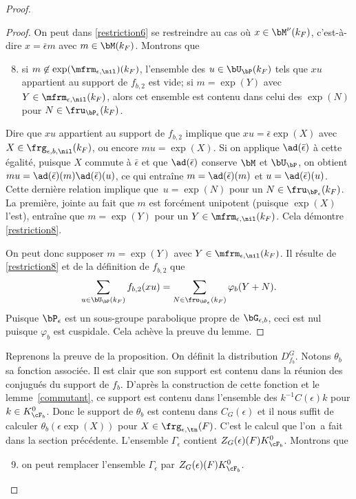 \begin{proof}
\begin{proof}
On peut dans \eqref{restriction6} se restreindre au cas où $x\in \bM^{\nu}(k_{F})$, c'est-à-dire $x=\bar{\epsilon}m$ avec $m\in \bM(k_{F})$. Montrons que
\begin{enumerate}\setcounter{enumi}{7}
\item\label{restriction8}
si $m\not\in \exp(\boldsymbol{\mfrm}_{\epsilon,\nil})(k_{F})$, l'ensemble des $u\in \bU_{\bP}(k_{F})$ tels que $xu$ appartient au support de $f_{b,2}$ est vide; si $m=\exp(Y)$ avec $Y\in \boldsymbol{\mfrm}_{\epsilon,\nil}(k_{F})$, alors cet ensemble est contenu dans celui des $\exp(N)$ pour $N\in \boldsymbol{\fru}_{\bP_{\epsilon}}(k_{F})$.
\end{enumerate}

Dire que $xu$ appartient au support de $f_{b,2}$ implique que $xu=\bar{\epsilon} \exp(X)$ avec $X\in \boldsymbol{\frg}_{\epsilon,b,\nil}(k_{F})$, ou encore $mu=\exp(X)$. Si on applique $\ad(\bar{\epsilon})$ à cette égalité, puisque $X$ commute à $\bar{\epsilon}$ et que $\ad(\bar{\epsilon})$ conserve $\bM$ et $\bU_{\bP}$, on obtient $mu=\ad(\bar{\epsilon})(m)\ad(\bar{\epsilon})(u)$, ce qui entraîne $m=\ad(\bar{\epsilon})(m)$ et $u=\ad(\bar{\epsilon})(u)$. Cette dernière relation implique que~$u=\exp(N)$ pour un $N\in \boldsymbol{\fru}_{\bP_{\epsilon}}(k_{F})$. La première, jointe au fait que $m$ est forcément unipotent (puisque $\exp(X)$ l'est), entraîne que $m=\exp(Y)$ pour un $Y\in \boldsymbol{\mfrm}_{\epsilon,\nil}(k_{F})$. Cela démontre \eqref{restriction8}.

On peut donc supposer $m=\exp(Y)$ avec $Y\in \boldsymbol{\mfrm}_{\epsilon,\nil}(k_{F})$. Il résulte de \eqref{restriction8} et de la définition de $f_{b,2}$ que
\[
\sum_{u\in \bU_{\bP}(k_{F})}f_{b,2}(xu)=\sum_{N\in \boldsymbol{\fru}_{\bP_{\epsilon}}(k_{F}) }\varphi_{b}(Y+N).
\]
Puisque $\bP_{\epsilon}$ est un sous-groupe parabolique propre de $\bG_{\epsilon,b}$, ceci est nul puisque $\varphi_{b}$ est cuspidale. Cela achève la preuve du lemme.
\end{proof}

Reprenons la preuve de la proposition. On définit la distribution $D^G_{f_{b}}$. Notons $\theta_{b}$ sa fonction associée. Il est clair que son support est contenu dans la réunion des conjugués du support de $f_{b}$. D'après la construction de cette fonction et le lemme~\ref{commutant}, ce support est contenu dans l'ensemble des $k^{-1}C(\epsilon)k$ pour $k\in K_{\cF_{b}}^0$. Donc le support de $\theta_{b}$ est contenu dans $C_{G}(\epsilon)$ et il nous suffit de calculer $\theta_{b}(\epsilon \exp(X))$ pour $X\in \frg_{\epsilon,\tn}(F)$.
C'est le calcul que l'on~a fait dans la section précédente. L'ensemble $\Gamma_{\epsilon}$ contient $Z_{G}(\epsilon)(F)K_{\cF_{b}}^0$. Montrons que
\begin{enumerate}\setcounter{enumi}{8}
\item\label{restriction9}
on peut remplacer l'ensemble $\Gamma_{\epsilon}$ par $Z_{G}(\epsilon)(F)K_{\cF_{b}}^0$.
\end{enumerate}


\end{proof}
